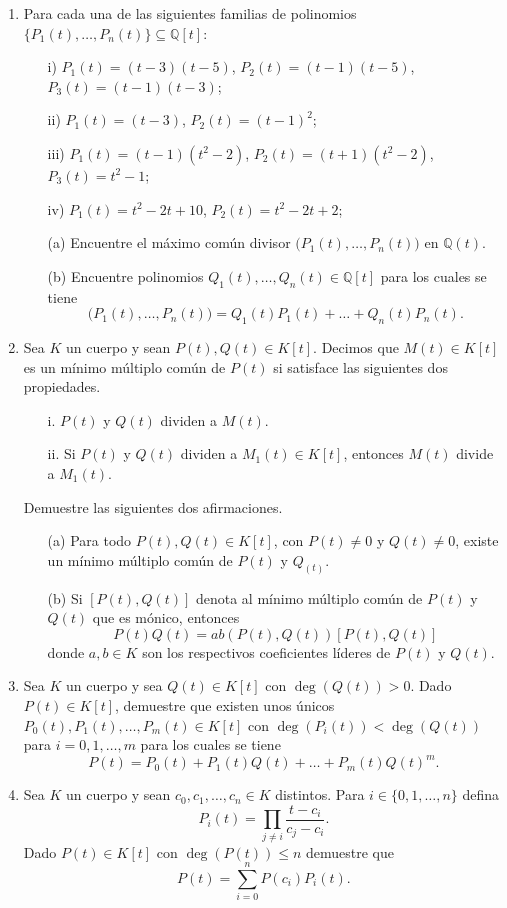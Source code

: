 \begin{enumerate}
\item Para cada una de las siguientes familias de polinomios $\{P_1(t),\ldots,P_n(t)\}\subseteq\mathbb{Q}[t]$:
\begin{itemize}
\item[i)] $P_1(t)=(t-3)(t-5)$, $P_2(t)=(t-1)(t-5)$, $P_3(t)=(t-1)(t-3)$;
\item[ii)] $P_1(t)=(t-3)$, $P_2(t)=(t-1)^2$;
\item[iii)] $P_1(t)=(t-1)(t^2-2)$, $P_2(t)=(t+1)(t^2-2)$, $P_3(t)=t^2-1$;
\item[iv)] $P_1(t)=t^2-2t+10$, $P_2(t)=t^2-2t+2$;
\end{itemize}
\begin{itemize}
\item[(a)] Encuentre el m\'aximo com\'un divisor $\big(P_1(t),\ldots,P_n(t)\big)$ en $\mathbb{Q}(t)$.
\item[(b)] Encuentre polinomios $Q_1(t),\ldots,Q_n(t)\in\mathbb{Q}[t]$ para los cuales se tiene
$$\big(P_1(t),\ldots,P_n(t)\big)=Q_1(t)P_1(t)+\ldots+Q_n(t)P_n(t).$$
\end{itemize}

\item\label{ejmcm} Sea $K$ un cuerpo y sean $P(t),Q(t)\in K[t]$. Decimos que $M(t)\in K[t]$ es un m\'inimo m\'ultiplo com\'un de $P(t)$ si satisface las siguientes dos propiedades.
\begin{itemize}
\item[i.] $P(t)$ y $Q(t)$ dividen a $M(t)$.
\item[ii.] Si $P(t)$ y $Q(t)$ dividen a $M_1(t)\in K[t]$, entonces $M(t)$ divide a $M_1(t)$.
\end{itemize}
Demuestre las siguientes dos afirmaciones.
\begin{itemize}
\item[(a)] Para todo $P(t),Q(t)\in K[t]$, con $P(t)\ne 0$ y $Q(t)\ne 0$, existe un m\'inimo m\'ultiplo com\'un de $P(t)$ y $Q_(t)$.
\item[(b)] Si $[P(t),Q(t)]$ denota al m\'inimo m\'ultiplo com\'un de $P(t)$ y $Q(t)$ que es m\'onico, entonces 
$$P(t)Q(t)=ab(P(t),Q(t))[P(t),Q(t)]$$
donde $a,b\in K$ son los respectivos coeficientes l\'ideres de $P(t)$ y $Q(t)$.
\end{itemize} 

\item Sea $K$ un cuerpo y sea $Q(t)\in K[t]$ con $\deg(Q(t))>0$. Dado $P(t)\in K[t]$, demuestre que existen unos \'unicos $P_0(t),P_1(t),\ldots,P_m(t)\in K[t]$ con $\deg(P_i(t))<\deg(Q(t))$ para $i=0,1,\ldots,m$ para los cuales se tiene
$$P(t)=P_0(t)+P_1(t)Q(t)+\ldots+P_m(t)Q(t)^m.$$

\item Sea $K$ un cuerpo y sean $c_0,c_1,\ldots,c_n\in K$ distintos. Para $i\in\{0,1,\ldots,n\}$ defina
$$P_i(t)=\prod_{j\ne i} \dfrac{t-c_i}{c_j-c_i}.$$
Dado $P(t)\in K[t]$ con $\deg(P(t))\le n$ demuestre que
$$P(t)=\sum_{i=0}^n P(c_i)P_i(t).$$
\end{enumerate}